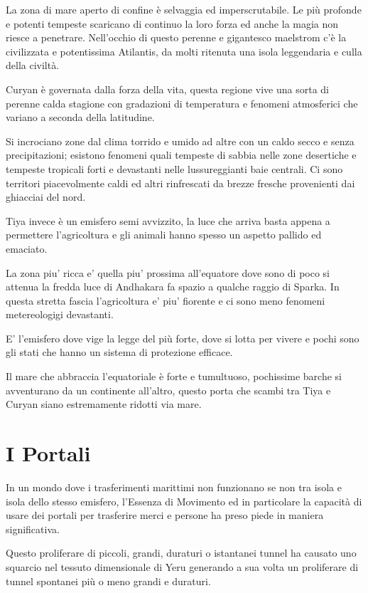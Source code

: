 \documentclass[a4paper,11pt,twoside,openany]{book}
\begin{document}
La zona di mare aperto di confine è selvaggia ed imperscrutabile. Le più profonde e potenti tempeste scaricano di continuo la loro forza ed anche la magia non riesce a penetrare. Nell'occhio di questo perenne e gigantesco maelstrom c'è la civilizzata e potentissima Atilantis, da molti ritenuta una isola leggendaria e culla della civiltà.

Curyan è governata dalla forza della vita, questa regione vive una sorta di perenne calda stagione con gradazioni di temperatura e fenomeni atmosferici che variano a seconda della latitudine.

Si incrociano zone dal clima torrido e umido ad altre con un caldo secco e senza precipitazioni; esistono fenomeni quali tempeste di sabbia nelle zone desertiche e tempeste tropicali forti e devastanti nelle lussureggianti baie centrali.
Ci sono territori piacevolmente caldi ed altri rinfrescati da brezze fresche provenienti dai ghiacciai del nord.

Tiya invece è un emisfero semi avvizzito, la luce che arriva basta appena a permettere l'agricoltura e gli animali hanno spesso un aspetto pallido ed emaciato.

La zona piu' ricca e' quella piu' prossima all'equatore dove sono di poco si attenua la fredda luce di Andhakara fa spazio a qualche raggio di Sparka.
In questa stretta fascia l'agricoltura e' piu' fiorente e ci sono meno fenomeni metereologigi devastanti.

E' l'emisfero dove vige la legge del più forte, dove si lotta per vivere e pochi sono gli stati che hanno un sistema di protezione efficace.

Il mare che abbraccia l'equatoriale è forte e tumultuoso, pochissime barche si avventurano da un continente all'altro, questo porta che scambi tra Tiya e Curyan siano estremamente ridotti via mare.


\pagebreak

\section{I Portali}

\label{i-portali}

In un mondo dove i trasferimenti marittimi non funzionano se non tra isola e isola dello stesso emisfero, l'Essenza di Movimento ed in particolare la capacità di usare dei portali per trasferire merci e persone ha preso piede in maniera significativa.

Questo proliferare di piccoli, grandi, duraturi o istantanei tunnel ha causato uno squarcio nel tessuto dimensionale di Yeru generando a sua volta un proliferare di tunnel spontanei più o meno grandi e duraturi.
\end{document}
